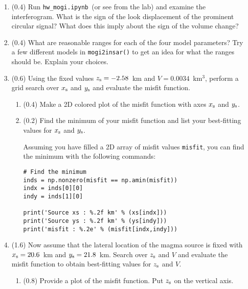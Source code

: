 \documentclass[11pt,titlepage,fleqn]{article}
\newcommand{\tfile}{{\tt hw\_mogi.ipynb}}
\begin{document}
\begin{enumerate}
\item (0.4) Run \tfile\ (or see  from the lab) and examine the interferogram. What is the sign of the look displacement of the prominent circular signal? What does this imply about the sign of the volume change?

\item (0.4) What are reasonable ranges for each of the four model parameters? Try a few different models in \verb+mogi2insar()+ to get an idea for what the ranges should be. Explain your choices.

\item (0.6) Using the fixed values $z_{\rm s} = -2.58$~km and $V = 0.0034$~km$^3$, perform a grid search over $x_{\rm s}$ and $y_{\rm s}$ and evaluate the misfit function.
%
\begin{enumerate}
\item (0.4) Make a 2D colored plot of the misfit function with axes $x_{\rm s}$ and $y_{\rm s}$.


\item (0.2) Find the minimum of your misfit function and list your best-fitting values for $x_{\rm s}$ and $y_{\rm s}$.

Assuming you have filled a 2D array of misfit values \verb+misfit+, you can find the minimum with the following commands:
%
\begin{verbatim}
# Find the minimum
inds = np.nonzero(misfit == np.amin(misfit))
indx = inds[0][0]
indy = inds[1][0]

print('Source xs : %.2f km' % (xs[indx]))
print('Source ys : %.2f km' % (ys[indy]))
print('misfit : %.2e' % (misfit[indx,indy]))
\end{verbatim}

\end{enumerate}

\item (1.6) Now assume that the lateral location of the magma source is fixed with $x_{\rm s} = 20.6$~km and $y_{\rm s} = 21.8$~km. Search over $z_{\rm s}$ and $V$ and evaluate the misfit function to obtain best-fitting values for $z_{\rm s}$ and $V$.
%
\begin{enumerate}
\item (0.8) Provide a plot of the misfit function. Put $z_{\rm s}$ on the vertical axis.


\end{enumerate}
\end{enumerate}
\end{document}
